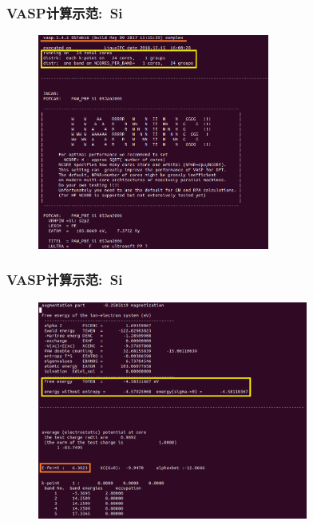\frame
{
	\frametitle{\textrm{VASP}计算示范:~\textrm{Si}}
\vspace*{-10pt}
\begin{figure}[h!]
\centering
\includegraphics[width=3.0in]{Figures/VASP_example-Si_OUTCAR-1.png}
\label{Fig:VASP-Si_OUTCAR-part1}
\end{figure}
}

\frame
{
	\frametitle{\textrm{VASP}计算示范:~\textrm{Si}}
\vspace*{-10pt}
\begin{figure}[h!]
\centering
\includegraphics[width=3.5in]{Figures/VASP_example-Si_OUTCAR-2.png}
\label{Fig:VASP-Si_OUTCAR-part2}
\end{figure}
}

